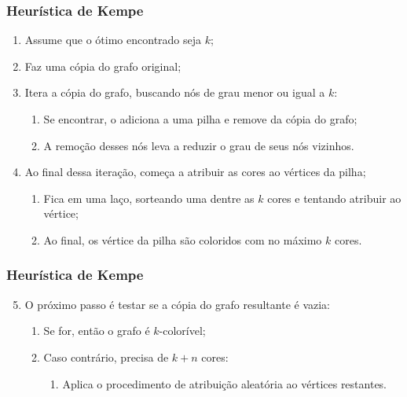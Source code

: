 \documentclass[compress, hide notes]{beamer}
\let\olditem=\item%
\renewcommand{\item}{\olditem \justifying}%
\begin{document}
 
 \begin{frame}
 \frametitle{Heurística de Kempe}
 
 \begin{enumerate}
 \item Assume que o ótimo encontrado seja $k$;
 
 \bigskip
 
\item Faz uma cópia do grafo original;
 
 \bigskip
 
 \item Itera a cópia do grafo, buscando nós de grau menor ou igual a $k$:
 \begin{enumerate}
 \item Se encontrar, o adiciona a uma pilha e remove da cópia do grafo;
 
 \bigskip
 \bigskip
 
 \item A remoção desses nós leva a reduzir o grau de seus nós vizinhos.
 \end{enumerate}
 
 \bigskip
 
 \item Ao final dessa iteração, começa a atribuir as cores ao vértices da pilha;
 \begin{enumerate}
 \item Fica em uma laço, sorteando uma dentre as $k$ cores e tentando atribuir ao vértice;
 
 \bigskip
 
 \item Ao final, os vértice da pilha são coloridos com no máximo $k$ cores.
 \end{enumerate}
 \end{enumerate}
 
 \end{frame}
 
 \begin{frame}
 \frametitle{Heurística de Kempe}
 \begin{enumerate}
 \setcounter{enumi}{4}
 \item O próximo passo é testar se a cópia do grafo resultante é vazia:
 \begin{enumerate}
 
 \bigskip
 
 \item Se for, então o grafo é $k$-colorível;
 
 \bigskip
 
 \item Caso contrário, precisa de $k+n$ cores:
 
 \bigskip
 
 \begin{enumerate}
 \item Aplica o procedimento de atribuição aleatória ao vértices restantes.
 \end{enumerate}
 \end{enumerate}
 \end{enumerate}
 
 \end{frame}
 
\end{document}
